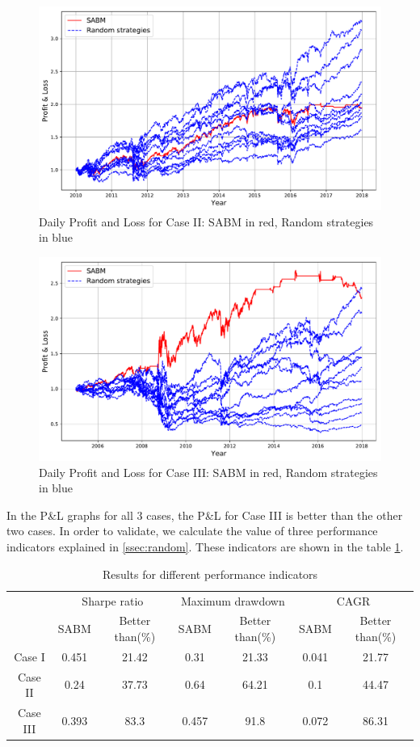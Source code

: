 \begin{figure}[h!] 
\centering 
 \includegraphics[width=0.75\linewidth]{figures/pnls_llf10.pdf} 
\caption{Daily Profit and Loss for Case II: SABM in red, Random strategies in blue}
\label{fig:pnl2}
\end{figure}

\begin{figure}[h!] 
\centering 
 \includegraphics[width=0.75\linewidth]{figures/pnls_llf5.pdf} 
\caption{Daily Profit and Loss for Case III: SABM in red, Random strategies in blue}
\label{fig:pnl3}
\end{figure}

In the P\&L graphs for all 3 cases, the P\&L for Case III is better than the other two cases. In order to validate, we calculate the value of three performance indicators explained in \ref{ssec:random}. These indicators are shown in the table \ref{table:random}. 

\begin{table}[h!]
\begin{center}
\begin{tabular}{|c|cc|cc|cc|}
\hline
    \multicolumn{1}{|c|}{}&  \multicolumn{2}{|c|}{Sharpe ratio} & \multicolumn{2}{|c|}{Maximum drawdown} & \multicolumn{2}{|c|}{CAGR}\\
    &  SABM &  Better than(\%) & SABM & Better than(\%) & SABM & Better than(\%) \\
\hline
    Case I &  0.451 &   21.42 &   0.31  &    21.33  & 0.041  & 21.77 \\
    Case II &  0.24 &   37.73 &   0.64  &    64.21  & 0.1    & 44.47  \\
    Case III &  0.393 &   83.3 &   0.457 &    91.8  & 0.072  & 86.31 \\
\hline
\end{tabular}
\end{center}
\caption{Results for different performance indicators}
\label{table:random}
\end{table}

